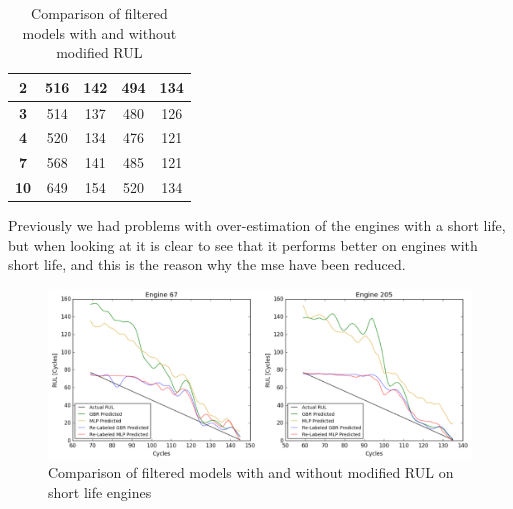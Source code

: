 \documentclass[english, a4paper]{report}
\begin{document}
{{{{\begin{table}[H]
\begin{tabular}{ccccc}
                        \multicolumn{1}{|c|}{\textbf{2}} & \multicolumn{1}{c|}{516} & \multicolumn{1}{c|}{142} & \multicolumn{1}{c|}{494} & \multicolumn{1}{c|}{134} \\ \hline
                        \multicolumn{1}{|c|}{\textbf{3}} & \multicolumn{1}{c|}{514} & \multicolumn{1}{c|}{137} & \multicolumn{1}{c|}{480} & \multicolumn{1}{c|}{126} \\ \hline
                        \multicolumn{1}{|c|}{\textbf{4}} & \multicolumn{1}{c|}{520} & \multicolumn{1}{c|}{134} & \multicolumn{1}{c|}{476} & \multicolumn{1}{c|}{121} \\ \hline
                        \multicolumn{1}{|c|}{\textbf{7}} & \multicolumn{1}{c|}{568} & \multicolumn{1}{c|}{141} & \multicolumn{1}{c|}{485} & \multicolumn{1}{c|}{121} \\ \hline
                        \multicolumn{1}{|c|}{\textbf{10}} & \multicolumn{1}{c|}{649} & \multicolumn{1}{c|}{154} & \multicolumn{1}{c|}{520} & \multicolumn{1}{c|}{134} \\ \hline
                    \end{tabular}
                    \caption{Comparison of filtered models with and without modified RUL}
                    \label{mseComparisonAfterFilter}
                \end{table}
                
                Previously we had problems with over-estimation of the engines with a short life, but when looking at  it is clear to see that it performs better on engines with short life, and this is the reason why the \gls{mse} have been reduced. 
                
                \begin{figure}[H]
                    \centering \includegraphics[width=\textwidth]{shortLifetimeEng}
                    \caption{Comparison of filtered models with and without modified RUL on short life engines} \label{fig:comparisonAfterFilterShortLife}
                \end{figure}
            }
        }
        
}}
\end{document}
